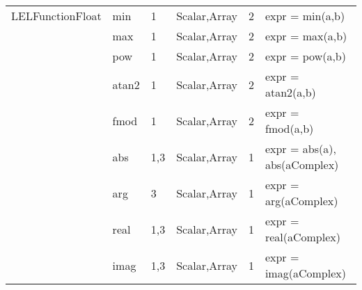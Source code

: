 \begin{center}
\begin{tabular}{|l|l|l|l|l|l}
LELFunctionFloat  &    min      &   1          &   Scalar,Array   &   2   &   expr = min(a,b) \\
                  &    max      &   1          &   Scalar,Array   &   2   &   expr = max(a,b) \\
                  &    pow      &   1          &   Scalar,Array   &   2   &   expr = pow(a,b) \\
                  &    atan2    &   1          &   Scalar,Array   &   2   &   expr = atan2(a,b) \\
                  &    fmod     &   1          &   Scalar,Array   &   2   &   expr = fmod(a,b) \\
                  &    abs      &   1,3        &   Scalar,Array   &   1   &   expr = abs(a), abs(aComplex) \\
                  &    arg      &   3          &   Scalar,Array   &   1   &   expr = arg(aComplex) \\
                  &    real     &   1,3        &   Scalar,Array   &   1   &   expr = real(aComplex) \\
                  &    imag     &   1,3        &   Scalar,Array   &   1   &   expr = imag(aComplex) \\
\hline
\end{tabular}
\end{center}
 


